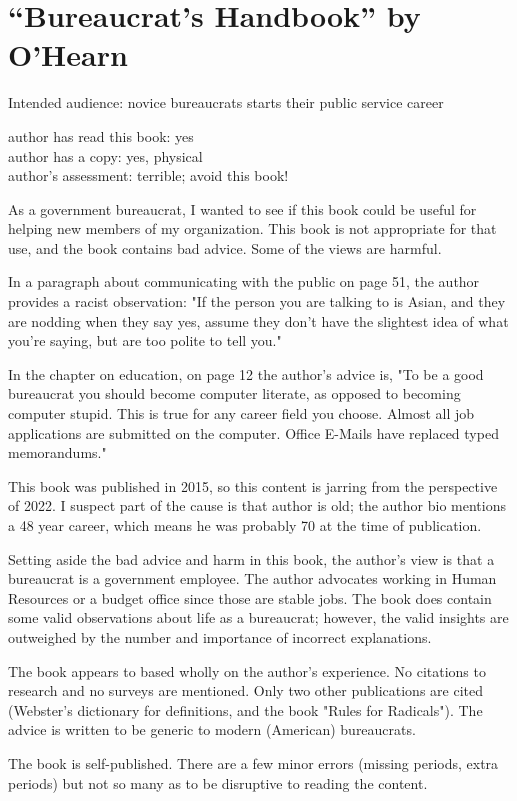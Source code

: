 \section{``Bureaucrat's Handbook'' by O'Hearn\label{review:ohearn_handbook}}

\cite{2015_OHearn}

Intended audience: novice bureaucrats starts their public service career

author has read this book: yes\\
author has a copy: yes, physical\\
author's assessment: terrible; avoid this book!


As a government bureaucrat, I wanted to see if this book could be useful for helping new members of my organization. This book is not appropriate for that use, and the book contains bad advice. Some of the views are harmful. 



In a paragraph about communicating with the public on page 51, the author provides a racist observation: "If the person you are talking to is Asian, and they are nodding when they say yes, assume they don't have the slightest idea of what you're saying, but are too polite to tell you."



In the chapter on education, on page 12 the author's advice is, "To be a good bureaucrat you should become computer literate, as opposed to becoming computer stupid. This is true for any career field you choose. Almost all job applications are submitted on the computer. Office E-Mails have replaced typed memorandums." 



This book was published in 2015, so this content is jarring from the perspective of 2022. I suspect part of the cause is that author is old; the author bio mentions a 48 year career, which means he was probably 70 at the time of publication. 



Setting aside the bad advice and harm in this book, the author's view is that a bureaucrat is a government employee. The author advocates working in Human Resources or a budget office since those are stable jobs. The book does contain some valid observations about life as a bureaucrat; however, the valid insights are outweighed by the number and importance of incorrect explanations. 



The book appears to based wholly on the author's experience. No citations to research and no surveys are mentioned. Only two other publications are cited (Webster's dictionary for definitions, and the book "Rules for Radicals").  The advice is written to be generic to modern (American) bureaucrats. 



The book is self-published. There are a few minor errors (missing periods, extra periods) but not so many as to be disruptive to reading the content. 
